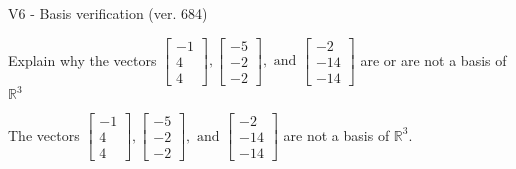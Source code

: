 \begin{exercise}
  \begin{exerciseTitle}V6 - Basis verification (ver. 684)\end{exerciseTitle}
  \begin{exerciseStatement}
    Explain why the vectors \(\left[\begin{array}{r}
-1 \\
4 \\
4
\end{array}\right] , \left[\begin{array}{r}
-5 \\
-2 \\
-2
\end{array}\right] , \text{ and } \left[\begin{array}{r}
-2 \\
-14 \\
-14
\end{array}\right]\) are or are not a basis of \(\mathbb{R}^3\)	


  \end{exerciseStatement}
  \begin{exerciseAnswer}
   The vectors \(\left[\begin{array}{r}
-1 \\
4 \\
4
\end{array}\right] , \left[\begin{array}{r}
-5 \\
-2 \\
-2
\end{array}\right] , \text{ and } \left[\begin{array}{r}
-2 \\
-14 \\
-14
\end{array}\right]\) 
  	 are not  a basis of \(\mathbb{R}^3\).
  


  \end{exerciseAnswer}
\end{exercise}